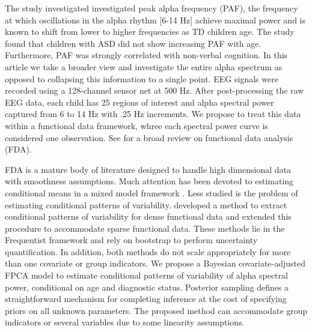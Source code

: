 \documentclass[useAMS,referee,usenatbib]{biom}
\begin{document}
The study investigated investigated peak alpha frequency (PAF), the frequency at which oscillations in the alpha rhythm [6-14 Hz] achieve maximal power and is known to shift from lower to higher frequencies as TD children age. The study found that children with ASD did not show increasing PAF with age. Furthermore, PAF was strongly correlated with non-verbal cognition. In this article we take a broader view and investigate the entire alpha spectrum as opposed to collapsing this information to a single point. EEG signals were recorded using a 128-channel sensor net at 500 Hz. After post-processing the raw EEG data, each child has 25 regions of interest and alpha spectral power captured from 6 to 14 Hz with .25 Hz increments. We propose to treat this data within a functional data framework, whree each spectral power curve is considered one observation. See \cite{Wang2016} for a broad review on functional data analysis (FDA). 

FDA is a mature body of literature designed to handle high dimensional data with smoothness assumptions. Much attention has been devoted to estimating conditional means in a mixed model framework \citep{Guo2002, Morris2006, Montagna2012}. Less studied is the problem of estimating conditional patterns of variability. \cite{Cardot2007} developed a method to extract conditional patterns of variability for dense functional data and \cite{Jiang2010} extended this procedure to accommodate sparse functional data. These methods lie in the Frequentist framework and rely on bootstrap to perform uncertainty quantification. In addition, both methods do not scale appropriately for more than one covariate or group indicators. We propose a Bayesian covariate-adjusted FPCA model to estimate conditional patterns of variability of alpha spectral power, conditional on age and diagnostic status. Posterior sampling defines a straightforward mechanism for completing inference at the cost of specifying priors on all unknown parameters. The proposed method can accommodate group indicators or several variables due to some linearity assumptions. 
\end{document}
